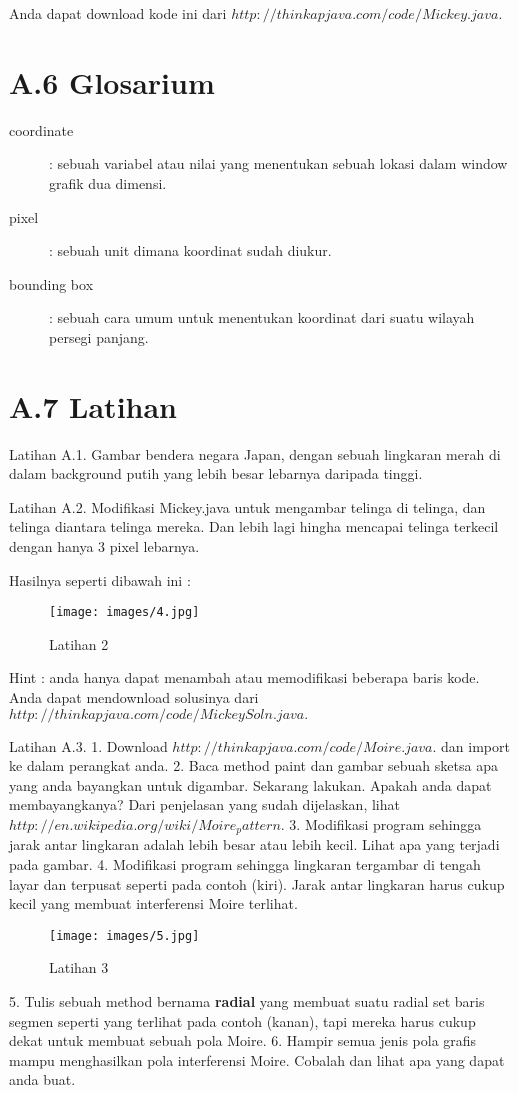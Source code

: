 Anda dapat download kode ini dari $http://thinkapjava.com/code/Mickey.java.$

\section{A.6 Glosarium}
\begin{description}
	\item[coordinate] : sebuah variabel atau nilai yang menentukan sebuah lokasi dalam window grafik dua dimensi.
\end{description}
\begin{description}
	\item[pixel] : sebuah unit dimana koordinat sudah diukur.
\end{description}
\begin{description}
	\item[bounding box] : sebuah cara umum untuk menentukan koordinat dari suatu wilayah persegi panjang.
\end{description}

\section{A.7 Latihan}
Latihan A.1. Gambar bendera negara Japan, dengan sebuah lingkaran merah di dalam background putih yang lebih besar lebarnya daripada tinggi.

Latihan A.2. Modifikasi Mickey.java untuk mengambar telinga di telinga, dan telinga diantara telinga mereka. Dan lebih lagi hingha mencapai telinga terkecil dengan hanya 3 pixel lebarnya.

Hasilnya seperti dibawah ini :
\begin{figure}[H]
	\centering \texttt{[image: images/4.jpg]}
	\caption{Latihan 2}
	\label{fig:binaryTreeRekursif}
\end{figure}
Hint : anda hanya dapat menambah atau memodifikasi beberapa baris kode.
Anda dapat mendownload solusinya dari $http://thinkapjava.com/code/MickeySoln.java.$

Latihan A.3. 
1.	Download $http://thinkapjava.com/code/Moire.java.$ dan import ke dalam perangkat anda.
2.	Baca method paint dan gambar sebuah sketsa apa yang anda bayangkan untuk digambar. Sekarang lakukan. Apakah anda dapat membayangkanya? Dari penjelasan yang sudah dijelaskan, lihat $http://en.wikipedia.org/wiki/Moire_pattern.$
3.	Modifikasi program sehingga jarak antar lingkaran adalah lebih besar atau lebih kecil. Lihat apa yang terjadi pada gambar.
4.	Modifikasi program sehingga lingkaran tergambar di tengah layar dan terpusat seperti pada contoh (kiri). Jarak antar lingkaran harus cukup kecil yang membuat interferensi Moire terlihat.
\begin{figure}[H]
	\centering \texttt{[image: images/5.jpg]}
	\caption{Latihan 3}
	\label{fig:binaryTreeRekursif}
\end{figure}
5.	Tulis sebuah method bernama \textbf{radial} yang membuat suatu radial set baris segmen seperti yang terlihat pada contoh (kanan), tapi mereka harus cukup dekat untuk membuat sebuah pola Moire.
6.	Hampir semua jenis pola grafis mampu menghasilkan pola interferensi Moire. Cobalah dan lihat apa yang dapat anda buat.
